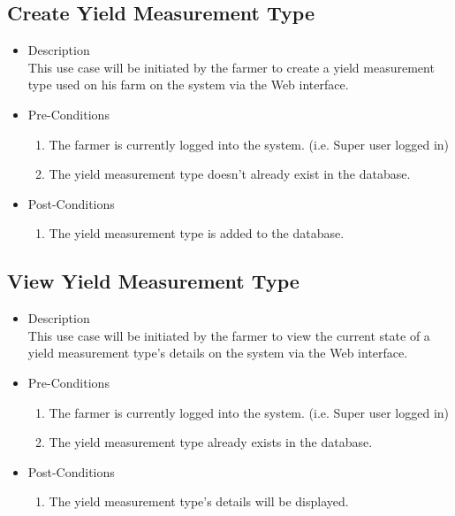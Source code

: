 \documentclass[11pt,fleqn]{book} %
\begin{document}
	\subsection{Create Yield Measurement Type}
	\begin{itemize}
		\item Description\\
		This use case will be initiated by the farmer to create a yield measurement type used on his farm on the system via the Web interface.
		\item Pre-Conditions
		\begin{enumerate}
			\item The farmer is currently logged into the system. (i.e. Super user logged in)
			\item The yield measurement type doesn’t already exist in the database. 				
		\end{enumerate}
		\item Post-Conditions
		\begin{enumerate}
			\item The yield measurement type is added to the database.
		\end{enumerate}
	\end{itemize}
	
	\subsection{View Yield Measurement Type}
	\begin{itemize}
		\item Description\\
		This use case will be initiated by the farmer to view the current state of a yield measurement type’s details on the system via the Web interface.
		\item Pre-Conditions
		\begin{enumerate}
			\item The farmer is currently logged into the system. (i.e. Super user logged in)
			\item The yield measurement type already exists in the database.		
		\end{enumerate}
		\item Post-Conditions
		\begin{enumerate}
			\item The yield measurement type’s details will be displayed.
		\end{enumerate}
	\end{itemize}
	
\end{document}
